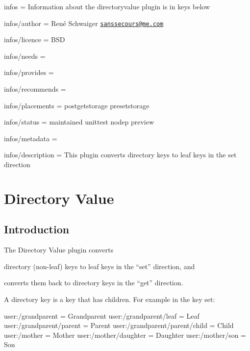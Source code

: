 
\begin{DoxyItemize}
\item infos = Information about the directoryvalue plugin is in keys below
\item infos/author = René Schwaiger \href{mailto:sanssecours@me.com}{\tt sanssecours@me.\+com}
\item infos/licence = B\+SD
\item infos/needs =
\item infos/provides =
\item infos/recommends =
\item infos/placements = postgetstorage presetstorage
\item infos/status = maintained unittest nodep preview
\item infos/metadata =
\item infos/description = This plugin converts directory keys to leaf keys in the set direction
\end{DoxyItemize}\hypertarget{autotoc_md170_src_plugins_directoryvalue_README_md}{}\section{Directory Value}\label{autotoc_md170_src_plugins_directoryvalue_README_md}
\hypertarget{autotoc_md170_autotoc_md171}{}\subsection{Introduction}\label{autotoc_md170_autotoc_md171}
The Directory Value plugin converts


\begin{DoxyEnumerate}
\item directory (non-\/leaf) keys to leaf keys in the “set” direction, and
\item converts them back to directory keys in the “get” direction.
\end{DoxyEnumerate}

A directory key is a key that has children. For example in the key set\+:


\begin{DoxyCode}
user:/grandparent                = Grandparent
user:/grandparent/leaf           = Leaf
user:/grandparent/parent         = Parent
user:/grandparent/parent/child   = Child
user:/mother                     = Mother
user:/mother/daughter            = Daughter
user:/mother/son                 = Son
\end{DoxyCode}


